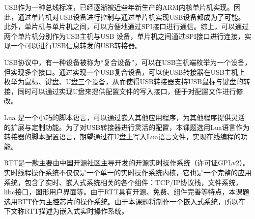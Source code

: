 \gls{USB}作为一种总线标准，已经逐渐被近些年新生产的ARM内核单片机实现。因此，通过单片机对USB设备进行控制与通过单片机实现USB设备都成为了可能。此外，单片机与单片机之间，可以方便地通过\gls{SPI}接口进行通信。综上，可以通过两个单片机分别作为USB主机与USB 设备，单片机之间通过\gls{SPI}接口进行连接，实现一个可以进行USB信息转发的USB转接器。

USB协议中，有一种设备被称为“复合设备”，可以在USB主机端枚举为一个设备，但实现多个接口。通过实现一个USB复合设备，可以使USB转接器在USB主机上枚举为鼠标、键盘、U盘三个设备，从而使得USB转接器支持USB鼠标与键盘的转接，同时可以通过实现U盘来提供配置文件的写入接口，便于对配置文件进行修改。

Lua 是一个小巧的脚本语言，可以通过嵌入其他应用程序，为其他程序提供灵活的扩展与定制功能。为了对USB转接器进行灵活的配置，本课题选用Lua语言作为转接器的脚本配置语言，期望通过在U盘上写入Lua语言文件，实现在线编程的功能。

\gls{RTT}是一款主要由中国开源社区主导开发的开源实时操作系统（许可证GPLv2）。实时线程操作系统不仅仅是一个单一的实时操作系统内核，它也是一个完整的应用系统，包含了实时、嵌入式系统相关的各个组件：TCP/IP协议栈，文件系统，libc接口，图形用户界面等。由于\gls{RTT}具有开源、免费、组件完善等特点，本课题选用RTT作为主控芯片的操作系统。由于本课题将制作一个嵌入式系统，所以在下文称RTT描述为嵌入式实时操作系统。





















